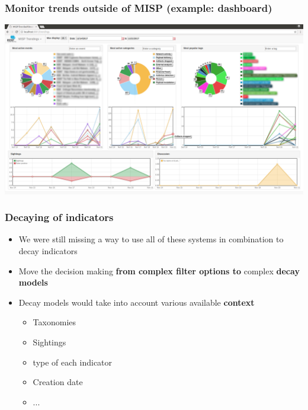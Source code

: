 \begin{frame}
  \frametitle{Monitor trends outside of MISP (example: dashboard)}
  \begin{center}
    \includegraphics[scale=0.2]{dashboard-trendings.png}
  \end{center}
\end{frame}

\begin{frame}
  \frametitle{Decaying of indicators}
  \begin{itemize}
    \item We were still missing a way to use all of these systems in combination to decay indicators
    \item Move the decision making \textbf{from complex filter options to} complex \textbf{decay models}
    \item Decay models would take into account various available {\bf context}
    \begin{itemize}
      \item Taxonomies
      \item Sightings
      \item type of each indicator
      \item Creation date
      \item ...
    \end{itemize}
  \end{itemize}
\end{frame}

